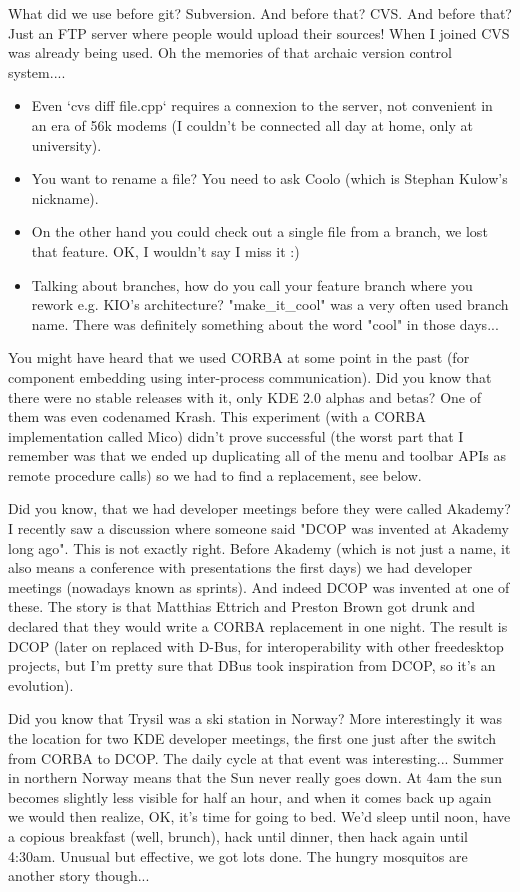 What did we use before git? Subversion. And before that? CVS. And before that? Just an FTP server where people would upload their sources!
When I joined CVS was already being used. Oh the memories of that archaic version control system....
\begin{itemize}
 \item Even `cvs diff file.cpp` requires a connexion to the server, not convenient in an era of 56k modems (I couldn't be connected all day at home, only at university).
 \item You want to rename a file? You need to ask Coolo (which is Stephan Kulow's nickname).
 \item On the other hand you could check out a single file from a branch, we lost that feature. OK, I wouldn't say I miss it :)
 \item Talking about branches, how do you call your feature branch where you rework e.g. KIO's architecture? "make\_it\_cool" was a very often used branch name. There was definitely something about the word "cool" in those days...
\end{itemize}

You might have heard that we used CORBA at some point in the past (for component embedding using inter-process communication). Did you know that there were no stable releases with it, only KDE 2.0 alphas and betas? One of them was even codenamed Krash. This experiment (with a CORBA implementation called Mico) didn't prove successful (the worst part that I remember was that we ended up duplicating all of the menu and toolbar APIs as remote procedure calls) so we had to find a replacement, see below.

Did you know, that we had developer meetings before they were called Akademy? I recently saw a discussion where someone said "DCOP was invented at Akademy long ago". This is not exactly right. Before Akademy (which is not just a name, it also means a conference with presentations the first days) we had developer meetings (nowadays known as sprints). And indeed DCOP was invented at one of these. 
The story is that Matthias Ettrich and Preston Brown got drunk and declared that they would write a CORBA replacement in one night. The result is DCOP (later on replaced with D-Bus, for interoperability with other freedesktop projects, but I'm pretty sure that DBus took inspiration from DCOP, so it's an evolution).

Did you know that Trysil was a ski station in Norway? More interestingly it was the location for two KDE developer meetings, the first one just after the switch from CORBA to DCOP.
The daily cycle at that event was interesting... Summer in northern Norway means that the Sun never really goes down. At 4am the sun becomes slightly less visible for half an hour, and when it comes back up again we would then realize, OK, it's time for going to bed. We'd sleep until noon, have a copious breakfast (well, brunch), hack until dinner, then hack again until 4:30am. Unusual but effective, we got lots done. The hungry mosquitos are another story though...

